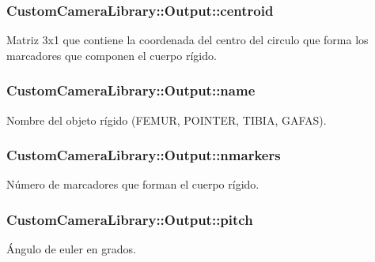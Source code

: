\subsubsection[{\texorpdfstring{centroid}{centroid}}]{\setlength{\rightskip}{0pt plus 5cm}Custom\+Camera\+Library\+::\+Output\+::centroid}\hypertarget{struct_custom_camera_library_1_1_output_a06fa54e7fbbd5075e6517b9a6c93ca97}{}\label{struct_custom_camera_library_1_1_output_a06fa54e7fbbd5075e6517b9a6c93ca97}
Matriz 3x1 que contiene la coordenada del centro del circulo que forma los marcadores que componen el cuerpo rígido. 
\subsubsection[{\texorpdfstring{name}{name}}]{\setlength{\rightskip}{0pt plus 5cm}Custom\+Camera\+Library\+::\+Output\+::name}\hypertarget{struct_custom_camera_library_1_1_output_af0a8276215ad6447ca0391d32ffe72f5}{}\label{struct_custom_camera_library_1_1_output_af0a8276215ad6447ca0391d32ffe72f5}
Nombre del objeto rígido (F\+E\+M\+UR, P\+O\+I\+N\+T\+ER, T\+I\+B\+IA, G\+A\+F\+AS). 
\subsubsection[{\texorpdfstring{nmarkers}{nmarkers}}]{\setlength{\rightskip}{0pt plus 5cm}Custom\+Camera\+Library\+::\+Output\+::nmarkers}\hypertarget{struct_custom_camera_library_1_1_output_a3361db4b0b8107c1458feebbb50c0589}{}\label{struct_custom_camera_library_1_1_output_a3361db4b0b8107c1458feebbb50c0589}
Número de marcadores que forman el cuerpo rígido. 
\subsubsection[{\texorpdfstring{pitch}{pitch}}]{\setlength{\rightskip}{0pt plus 5cm}Custom\+Camera\+Library\+::\+Output\+::pitch}\hypertarget{struct_custom_camera_library_1_1_output_a2ecfe8192c7cc66e5d3385c21ef4ab39}{}\label{struct_custom_camera_library_1_1_output_a2ecfe8192c7cc66e5d3385c21ef4ab39}
Ángulo de euler en grados. 
